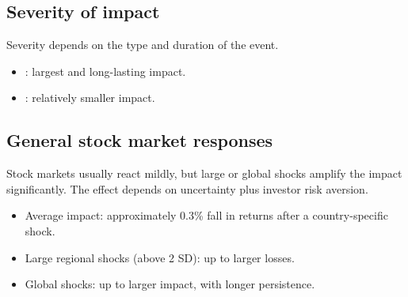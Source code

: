 \subsection*{Severity of impact}

Severity depends on the type and duration of the event.

\begin{itemize}
\item {}: largest and long-lasting impact.
\item {}: relatively smaller impact.
\end{itemize}


\subsection*{General stock market responses}

Stock markets usually react mildly, but large or global shocks amplify the impact
significantly. The effect depends on uncertainty plus investor risk aversion.

\begin{itemize}
\item Average impact: approximately 0.3\% fall in returns after a country-specific shock.
\item Large regional shocks (above 2 SD): up to  larger losses.
\item Global shocks: up to  larger impact, with longer persistence.
\end{itemize}

